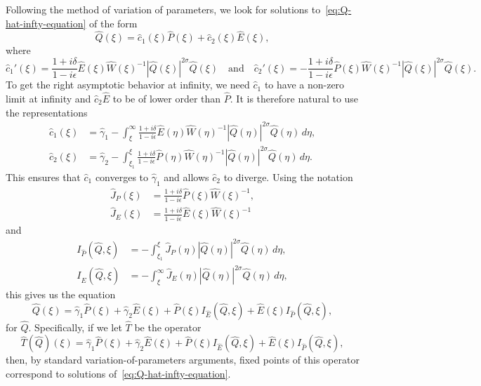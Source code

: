 \documentclass[11pt]{article}
\begin{document}
Following the method of variation of parameters, we look for solutions
to~\eqref{eq:Q-hat-infty-equation} of the form
\begin{equation*}
  \hat{Q}(\xi) = \hat{c}_{1}(\xi)\hat{P}(\xi) + \hat{c}_{2}(\xi)\hat{E}(\xi),
\end{equation*}
where
\begin{equation*}
  \hat{c}_{1}'(\xi) = \frac{1 + i\delta}{1 - i \epsilon}\hat{E}(\xi)\hat{W}(\xi)^{-1}|\hat{Q}(\xi)|^{2\sigma}\hat{Q}(\xi)
  \quad\text{and}\quad
  \hat{c}_{2}'(\xi) = -\frac{1 + i\delta}{1 - i \epsilon}\hat{P}(\xi)\hat{W}(\xi)^{-1}|\hat{Q}(\xi)|^{2\sigma}\hat{Q}(\xi).
\end{equation*}
To get the right asymptotic behavior at infinity, we need
\(\hat{c}_{1}\) to have a non-zero limit at infinity and
\(\hat{c}_{2}\hat{E}\) to be of lower order than \(\hat{P}\). It is
therefore natural to use the representations
\begin{align*}
  \hat{c}_{1}(\xi) &= \hat{\gamma}_{1} - \int_{\xi}^{\infty}\frac{1 + i\delta}{1 - i \epsilon}\hat{E}(\eta)\hat{W}(\eta)^{-1}|\hat{Q}(\eta)|^{2\sigma}\hat{Q}(\eta)\,d\eta,\\
  \hat{c}_{2}(\xi) &= \hat{\gamma}_{2} - \int_{\xi_{1}}^{\xi}\frac{1 + i\delta}{1 - i \epsilon}\hat{P}(\eta)\hat{W}(\eta)^{-1}|\hat{Q}(\eta)|^{2\sigma}\hat{Q}(\eta)\,d\eta.
\end{align*}
This ensures that \(\hat{c}_{1}\) converges to \(\hat{\gamma}_{1}\) and
allows \(\hat{c}_{2}\) to diverge. Using the notation
\begin{align*}
  \hat{J}_{P}(\xi) &= \frac{1 + i\delta}{1 - i \epsilon}\hat{P}(\xi)\hat{W}(\xi)^{-1},\\
  \hat{J}_{E}(\xi) &= \frac{1 + i\delta}{1 - i \epsilon}\hat{E}(\xi)\hat{W}(\xi)^{-1}
\end{align*}
and
\begin{align*}
  I_{\hat{P}}(\hat{Q}, \xi) &= -\int_{\xi_{1}}^{\xi} \hat{J}_{P}(\eta)|\hat{Q}(\eta)|^{2\sigma}\hat{Q}(\eta)\,d\eta,\\
  I_{\hat{E}}(\hat{Q}, \xi) &= -\int_{\xi}^{\infty} \hat{J}_{E}(\eta)|\hat{Q}(\eta)|^{2\sigma}\hat{Q}(\eta)\,d\eta,
\end{align*}
this gives us the equation
\begin{equation}\label{eq:Q-hat-infty-fixed-point-equation}
  \hat{Q}(\xi) = \hat{\gamma}_{1} \hat{P}(\xi) + \hat{\gamma}_{2}\hat{E}(\xi)
  + \hat{P}(\xi)I_{\hat{E}}(\hat{Q}, \xi) + \hat{E}(\xi)I_{\hat{P}}(\hat{Q}, \xi),
\end{equation}
for \(\hat{Q}\). Specifically, if we let \(\hat{T}\) be the operator
\begin{equation}\label{eq:T-hat}
  \hat{T}(\hat{Q})(\xi) = \hat{\gamma}_{1}\hat{P}(\xi) + \hat{\gamma}_{2}\hat{E}(\xi) + \hat{P}(\xi)I_{\hat{E}}(\hat{Q}, \xi) + \hat{E}(\xi)I_{\hat{P}}(\hat{Q}, \xi),
\end{equation}
then, by standard variation-of-parameters arguments, fixed points of
this operator correspond to solutions
of~\eqref{eq:Q-hat-infty-equation}.
\end{document}
